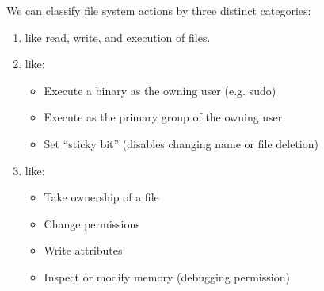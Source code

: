 We can classify file system actions by three distinct categories:
\begin{enumerate}
    \item {} like read, write, and execution of files.
    \item {} like:
    \begin{itemize}[noitemsep]
        \item Execute a binary as the owning user (e.g. sudo)
        \item Execute as the primary group of the owning user
        \item Set ``sticky bit'' (disables changing name or file deletion)
    \end{itemize}
    \item {} like:
    \begin{itemize}[noitemsep]
        \item Take ownership of a file
        \item Change permissions
        \item Write attributes
        \item Inspect or modify memory (debugging permission)
    \end{itemize}
\end{enumerate}




